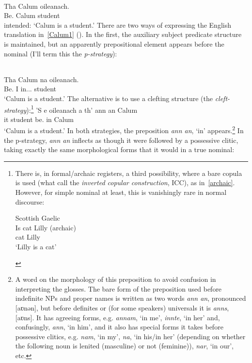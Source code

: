 \documentclass[output=paper]{langsci/langscibook}
\begin{document}
\ea {}\\
    \gll * Tha  Calum  oileanach.\\
        {} Be.\Prs{}  Calum student \\
    \glt {} intended: `Calum is a student.'\label{Calum1}
\z
There are two ways of expressing the English translation in~\eqref{Calum1}
(\citealt{cram:83,schreiner:15}). In the first, the auxiliary
subject predicate structure is maintained,  but an apparently prepositional
element appears before the nominal (I'll term this the \textit{p-strategy}):\largerpage

\ea {}\\
\gll Tha  Calum  na  oileanach.\\
Be.\Prs{}  I  in.\Poss{}.\Tsg{}.\M{}  student \\
\glt \enquote*{Calum is a student.}
\z
The alternative is to use a clefting structure (the \textit{cleft-strategy}):\footnote{\label{icc}There is,
    in formal/archaic registers, a
    third possibility, where a bare copula is used (what
    \citealt{adger-ramchand:03} call the \textit{inverted copular construction}, ICC),
    as in~\eqref{archaic}. However, for simple nominal  at least, this
    is vanishingly rare in normal discourse:

\begin{exe}\label{archaic}
    Scottish Gaelic\\
\gll Is cat Lilly \hfill (archaic)\\
\Cop{} cat Lilly\\
\glt \enquote*{Lilly is a cat}
\end{exe}}
\ea
\gll 'S e oileanach a th' {ann an} Calum\\
\Cop{} it student \Rel{} be.\Prs{} in Calum\\
\glt \enquote*{Calum is a student.}
\z
In both strategies, the preposition \emph{ann an}, `in' appears.\footnote{A word
on the morphology of this preposition to avoid confusion in interpreting the
glosses. The bare form of the preposition used before indefinite NPs and proper
names is written as two words \emph{ann an}, pronounced [aʋnən], but
before definites or (for some speakers) universals it is \emph{anns}, [aʋns].
It has agreeing forms, e.g. \emph{annam}, `in me', \emph{innte},
`in her' and, confusingly, \emph{ann}, `in him', and it also has special forms
it takes before possessive clitics, e.g. \emph{nam}, `in my', \emph{na}, `in
his/in her' (depending on whether the following noun is lenited (masculine) or
not (feminine)), \emph{nar}, `in our', etc.} In the p-strategy, \emph{ann an}
inflects as though it were followed by a possessive clitic, taking exactly the
same morphological forms that it would in a true nominal:
\end{document}
